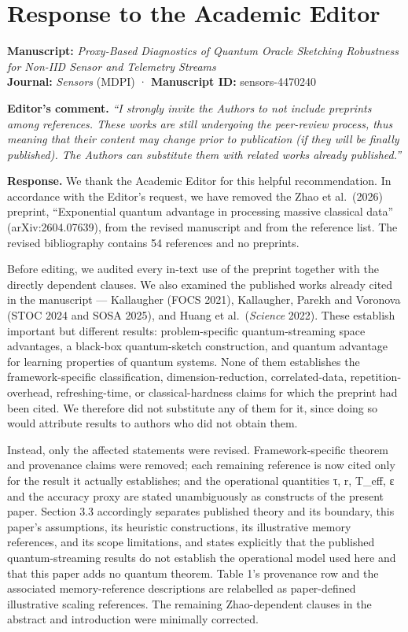\documentclass[
  11pt,
]{article}
\author{}
\date{}
\begin{document}
\section{Response to the Academic
Editor}\label{response-to-the-academic-editor}

\textbf{Manuscript:} \emph{Proxy-Based Diagnostics of Quantum Oracle
Sketching Robustness for Non-IID Sensor and Telemetry Streams}\\
\textbf{Journal:} \emph{Sensors} (MDPI) · \textbf{Manuscript ID:}
sensors-4470240

\textbf{Editor's comment.} \emph{``I strongly invite the Authors to not
include preprints among references. These works are still undergoing the
peer-review process, thus meaning that their content may change prior to
publication (if they will be finally published). The Authors can
substitute them with related works already published.''}

\textbf{Response.} We thank the Academic Editor for this helpful
recommendation. In accordance with the Editor's request, we have removed
the Zhao et al.~(2026) preprint, ``Exponential quantum advantage in
processing massive classical data'' (arXiv:2604.07639), from the revised
manuscript and from the reference list. The revised bibliography
contains 54 references and no preprints.

Before editing, we audited every in-text use of the preprint together
with the directly dependent clauses. We also examined the published
works already cited in the manuscript --- Kallaugher (FOCS 2021),
Kallaugher, Parekh and Voronova (STOC 2024 and SOSA 2025), and Huang et
al.~(\emph{Science} 2022). These establish important but different
results: problem-specific quantum-streaming space advantages, a
black-box quantum-sketch construction, and quantum advantage for
learning properties of quantum systems. None of them establishes the
framework-specific classification, dimension-reduction, correlated-data,
repetition-overhead, refreshing-time, or classical-hardness claims for
which the preprint had been cited. We therefore did not substitute any
of them for it, since doing so would attribute results to authors who
did not obtain them.

Instead, only the affected statements were revised. Framework-specific
theorem and provenance claims were removed; each remaining reference is
now cited only for the result it actually establishes; and the
operational quantities τ, r, T\_eff, ε and the accuracy proxy are stated
unambiguously as constructs of the present paper. Section 3.3
accordingly separates published theory and its boundary, this paper's
assumptions, its heuristic constructions, its illustrative memory
references, and its scope limitations, and states explicitly that the
published quantum-streaming results do not establish the operational
model used here and that this paper adds no quantum theorem. Table 1's
provenance row and the associated memory-reference descriptions are
relabelled as paper-defined illustrative scaling references. The
remaining Zhao-dependent clauses in the abstract and introduction were
minimally corrected.
\end{document}
